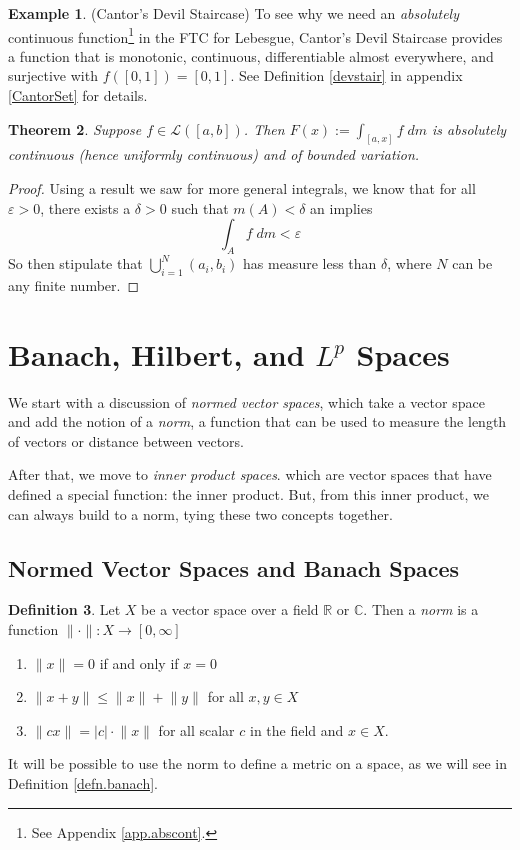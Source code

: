 \documentclass[12pt]{article}
\theoremstyle{plain}
\newtheorem{thm}{Theorem}[subsection]
\theoremstyle{definition}
\newtheorem{defn}[thm]{Definition}
\newtheorem{ex}[thm]{Example}
\theoremstyle{remark}
\begin{document}
\begin{ex} (Cantor's Devil Staircase) To see why we need an \emph{absolutely} continuous function\footnote{See Appendix \ref{app.abscont}.} in the FTC for Lebesgue, Cantor's Devil Staircase provides a function that is monotonic, continuous, differentiable almost everywhere, and surjective with $f([0,1])=[0,1]$. See Definition \ref{devstair} in appendix \ref{CantorSet} for details.
\end{ex}

\begin{thm}
Suppose $f\in\mathscr{L}([a,b])$. Then $F(x):=\int_{[a,x]} f\; dm$ is absolutely continuous (hence uniformly continuous) and of bounded variation.
\end{thm}
\begin{proof}
Using a result we saw for more general integrals, we know that for all $\varepsilon>0$, there exists a $\delta>0$ such that $m(A)<\delta$ an implies
\[
    \int_{A} f\; dm < \varepsilon
\]
So then stipulate that $\bigcup^N_{i=1} (a_i,b_i)$ has measure less than $\delta$, where $N$ can be any finite number.
\end{proof}


\newpage
\section{Banach, Hilbert, and $L^p$ Spaces}

We start with a discussion of \emph{normed vector spaces}, which take a vector space and add the notion of a \emph{norm}, a function that can be used to measure the length of vectors or distance between vectors.

After that, we move to \emph{inner product spaces}. which are vector spaces that have defined a special function: the inner product. But, from this inner product, we can always build to a norm, tying these two concepts together.

\subsection{Normed Vector Spaces and Banach Spaces}

\begin{defn} 
\label{defn.norm}
Let $X$ be a vector space over a field $\mathbb{R}$ or $\mathbb{C}$. Then a \emph{norm} is a function  $\lVert\cdot\rVert:X\rightarrow[0,\infty]$ 
\begin{enumerate}
\item $\lVert x\rVert=0$ if and only if $x=0$
\item $\lVert x + y\rVert\leq \lVert x\rVert+\lVert y\rVert$ for all $x,y\in X$
\item $\lVert cx\rVert= |c|\cdot\lVert x\rVert$ for all scalar $c$ in the field and $x\in X$.
\end{enumerate}
It will be possible to use the norm to define a metric on a space, as we will see in Definition \ref{defn.banach}.
\end{defn}
\end{document}

